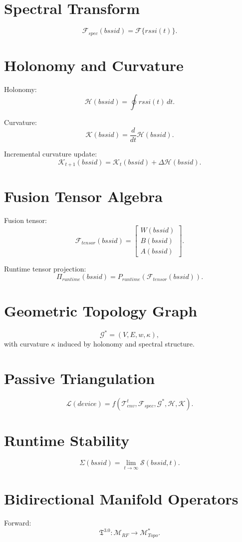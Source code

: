 \documentclass[11pt]{article}
\begin{document}
\section{Spectral Transform}
\[
\mathcal{F}_{spec}(bssid) = \mathcal{F}\{rssi(t)\}.
\]

\section{Holonomy and Curvature}
Holonomy:
\[
\mathcal{H}(bssid) = \oint rssi(t)\, dt.
\]

Curvature:
\[
\mathcal{K}(bssid) = \frac{d}{dt}\mathcal{H}(bssid).
\]

Incremental curvature update:
\[
\mathcal{K}_{t+1}(bssid)
= \mathcal{K}_{t}(bssid) + \Delta\mathcal{H}(bssid).
\]

\section{Fusion Tensor Algebra}
Fusion tensor:
\[
\mathcal{F}_{tensor}(bssid) =
\begin{bmatrix}
W(bssid) \\
B(bssid) \\
A(bssid)
\end{bmatrix}.
\]

Runtime tensor projection:
\[
\Pi_{runtime}(bssid) = P_{runtime}(\mathcal{F}_{tensor}(bssid)).
\]

\section{Geometric Topology Graph}
\[
\mathcal{G}^{\ast} = (V,E,w,\kappa),
\]
with curvature $\kappa$ induced by holonomy and spectral structure.

\section{Passive Triangulation}
\[
\mathcal{L}(device)
= f(\mathcal{T}_{env}^{t},\mathcal{F}_{spec},\mathcal{G}^{\ast},
\mathcal{H},\mathcal{K}).
\]

\section{Runtime Stability}
\[
\Sigma(bssid) = \lim_{t\to\infty} \mathcal{S}(bssid,t).
\]

\section{Bidirectional Manifold Operators}
Forward:
\[
\mathfrak{T}^{3.0} : \mathcal{M}_{RF} \to \mathcal{M}_{Topo}^{\ast}.
\]
\end{document}
